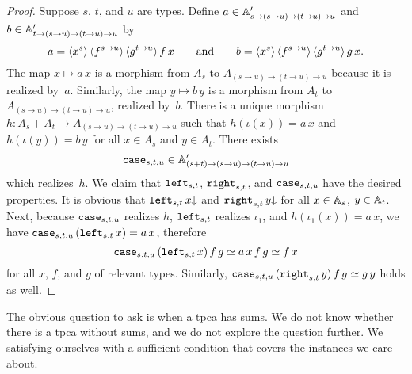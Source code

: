 \begin{proof}
  Suppose $s$, $t$, and $u$ are types. Define $a \in \mathbb{A}'_{s \to (s
    \to u) \to (t \to u) \to u}$ and $b \in \mathbb{A}'_{t \to (s \to u)
    \to (t \to u) \to u}$ by
  \begin{equation*}
    a = \langle x^{s} \rangle\,
        \langle f^{s \to u} \rangle\,
        \langle g^{t \to u} \rangle\,
        f\,x
   \qquad\text{and}\qquad
    b = \langle x^{s} \rangle\,
        \langle f^{s \to u} \rangle\,
        \langle g^{t \to u} \rangle\,
        g\,x.
  \end{equation*}
  The map $x \mapsto a\,x$ is a morphism from $A_s$ to
  $A_{(s \to u) \to (t \to u) \to u}$ because it is realized
  by~$a$. Similarly, the map $y \mapsto b\,y$ is a morphism from
  $A_t$ to $A_{(s \to u) \to (t \to u) \to u}$, realized
  by~$b$. There is a unique morphism $h : A_s + A_t \to
  A_{(s \to u) \to (t \to u) \to u}$ such that $h(\iota(x)) =
  a\,x$ and $h(\iota(y)) = b\,y$ for all $x \in A_s$ and $y \in
  A_t$. There exists
  \begin{equation*}
    \mathtt{case}_{s,t,u} \in \mathbb{A}'_{(s+t) \to (s \to u) \to (t \to u) \to u}
  \end{equation*}
  which realizes~$h$. We claim that $\mathtt{left}_{s,t}$,
  $\mathtt{right}_{s,t}$, and $\mathtt{case}_{s,t,u}$ have the desired
  properties. It is obvious that $\mathtt{left}_{s,t}\,x{\downarrow}$ and
  $\mathtt{right}_{s,t}\,y{\downarrow}$ for all $x \in \mathbb{A}_{s}$, $y \in
  \mathbb{A}_{t}$. Next, because $\mathtt{case}_{s,t,u}$ realizes $h$,
  $\mathtt{left}_{s,t}$ realizes $\iota_1$, and $h(\iota_1(x)) = a\,x$, we
  have $\mathtt{case}_{s,t,u}\,(\mathtt{left}_{s,t}\,x) = a\,x$, therefore
  \begin{equation*}
    \mathtt{case}_{s,t,u}\,(\mathtt{left}_{s,t}\,x)\,f\,g \simeq
    a\,x\,f\,g \simeq f\,x
  \end{equation*}
  for all $x$, $f$, and $g$ of relevant types. Similarly,
  $\mathtt{case}_{s,t,u}\,(\mathtt{right}_{s,t}\,y)\,f\,g \simeq g\,y$ holds
  as well.
\end{proof}

The obvious question to ask is when a tpca has sums. We do not know
whether there is a tpca without sums, and we do not explore the
question further. We satisfying ourselves with a sufficient condition
that covers the instances we care about.

